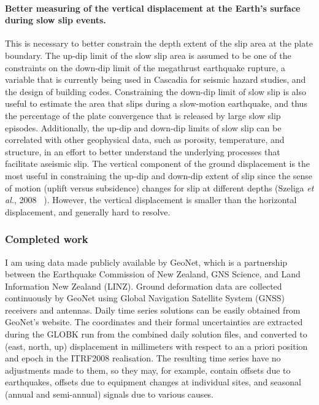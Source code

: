 \documentclass[letterpaper, 12pt]{article}
\begin{document}
\paragraph{Better measuring of the vertical displacement at the Earth's surface during slow slip events.} This is necessary to better constrain the depth extent of the slip area at the plate boundary. The up-dip limit of the slow slip area is assumed to be one of the constraints on the down-dip limit of the megathrust earthquake rupture, a variable that is currently being used in Cascadia for seismic hazard studies, and the design of building codes. Constraining the down-dip limit of slow slip is also useful to estimate the area that slips during a slow-motion earthquake, and thus the percentage of the plate convergence that is released by large slow slip episodes. Additionally, the up-dip and down-dip limits of slow slip can be correlated with other geophysical data, such as porosity, temperature, and structure, in an effort to better understand the underlying processes that facilitate aseismic slip. The vertical component of the ground displacement is the most useful in constraining the up-dip and down-dip extent of slip since the sense of motion (uplift versus subsidence) changes for slip at different depths (Szeliga \textit{et al.}, 2008 ~\cite{SZE_2008}). However, the vertical displacement is smaller than the horizontal displacement, and generally hard to resolve.

\subsubsection*{Completed work}

I am using data made publicly available by GeoNet, which is a partnership between the Earthquake Commission of New Zealand, GNS Science, and Land Information New Zealand (LINZ). Ground deformation data are collected continuously by GeoNet using Global Navigation Satellite System (GNSS) receivers and antennas. Daily time series solutions can be easily obtained from GeoNet's website. The coordinates and their formal uncertainties are extracted during the GLOBK run from the combined daily solution files, and converted to (east, north, up) displacement in millimeters with respect to an a priori position and epoch in the ITRF2008 realisation. The resulting time series have no adjustments made to them, so they may, for example, contain offsets due to earthquakes, offsets due to equipment changes at individual sites, and seasonal (annual and semi-annual) signals due to various causes. \\
\end{document}
